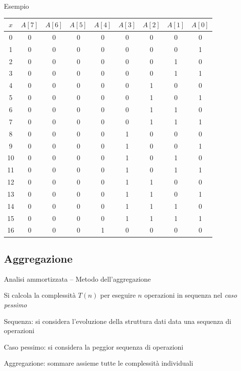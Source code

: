 \begin{frame}{Esempio}
	
\vspace{-6pt}
\small
\begin{tabular}{ccccccccc}
 $x$  &  $A[7]$ & $A[6]$ & $A[5]$ & $A[4]$ & $A[3]$ & $A[2]$ & $A[1]$ & $A[0]$ \\\hline
 0 & 0 & 0 & 0 & 0 & 0 & 0 & 0 & 0 \\
 1 & 0 & 0 & 0 & 0 & 0 & 0 & 0 & 1 \\
 2 & 0 & 0 & 0 & 0 & 0 & 0 & 1 & 0 \\
 3 & 0 & 0 & 0 & 0 & 0 & 0 & 1 & 1 \\
 4 & 0 & 0 & 0 & 0 & 0 & 1 & 0 & 0 \\
 5 & 0 & 0 & 0 & 0 & 0 & 1 & 0 & 1 \\
 6 & 0 & 0 & 0 & 0 & 0 & 1 & 1 & 0 \\
 7 & 0 & 0 & 0 & 0 & 0 & 1 & 1 & 1 \\
 8 & 0 & 0 & 0 & 0 & 1 & 0 & 0 & 0 \\
 9 & 0 & 0 & 0 & 0 & 1 & 0 & 0 & 1 \\
10 & 0 & 0 & 0 & 0 & 1 & 0 & 1 & 0 \\
11 & 0 & 0 & 0 & 0 & 1 & 0 & 1 & 1 \\
12 & 0 & 0 & 0 & 0 & 1 & 1 & 0 & 0 \\
13 & 0 & 0 & 0 & 0 & 1 & 1 & 0 & 1 \\
14 & 0 & 0 & 0 & 0 & 1 & 1 & 1 & 0 \\
15 & 0 & 0 & 0 & 0 & 1 & 1 & 1 & 1 \\
16 & 0 & 0 & 0 & 1 & 0 & 0 & 0 & 0 \\
\end{tabular}    

\end{frame}	



\subsection{Aggregazione}

\begin{frame}{Analisi ammortizzata -- Metodo dell'aggregazione}

\begin{myboxtitle}
\BI
\item Si calcola la complessità $T(n)$ per eseguire \alert{$n$ operazioni} in \alert{sequenza} nel \emph{caso pessimo}
\EI
\end{myboxtitle}

\bigskip
\BIL
\item \alert{Sequenza}: si considera l'evoluzione della struttura dati data una sequenza di operazioni 
\item \alert{Caso pessimo}: si considera la peggior sequenza di operazioni
\item \alert{ Aggregazione}: sommare assieme tutte le complessità individuali
\EIL


\end{frame}




